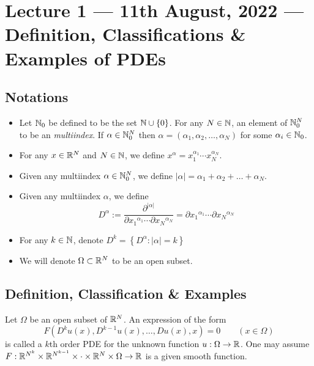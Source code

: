 \section{Lecture 1 --- 11th August, 2022 --- Definition, Classifications \& Examples of PDEs}
\subsection{Notations}
\begin{itemize}[label=--]
    \item Let $\mathbb N _0$ be defined to be the set $\mathbb N \cup \left\{ 0 \right\}$. For any $N\in \mathbb N$, an element of $\mathbb N _ 0 ^N$ to be an \textit{multiindex}. If $\alpha \in \mathbb N _0 ^N$ then $\alpha = \left( \alpha _1 ,\alpha_2,\ldots, \alpha_N \right)$ for some $\alpha_i \in \mathbb N _0$.

    \item For any $x\in \mathbb R ^N$ and $N\in \mathbb N$, we define $x^\alpha = x_1 ^{\alpha_1}\cdots x_N ^{\alpha _N}$.

    \item Given any multiindex $\alpha \in \mathbb N _0 ^N$, we define $|\alpha | =\alpha_1 + \alpha _2 + \ldots + \alpha _N$.

    \item Given any multiindex $\alpha$, we define
\begin{equation*}
    D^{\alpha} := \frac{\partial ^{|\alpha|}}{\partial {x_{1}} ^{\alpha_1} \cdots \partial {x_{N}} ^{\alpha_N}} = \partial { x_1 }^{\alpha _1}\cdots \partial { x_N }^{\alpha_N}
\end{equation*}

\item For any $k\in \mathbb N$, denote $D^k =\left\{ D^{\alpha} : |\alpha| =k \right\}$

\item We will denote $\Omega \subset \mathbb R ^N$ to be an open subset.

\end{itemize}

\subsection{Definition,  Classification \& Examples}
\begin{definition}
Let $\Omega$ be an open subset of $\mathbb R ^N$. An expression of the form  
\begin{equation}
    F\left( D^{k} u(x), D^{k-1} u(x), \ldots , Du(x), x \right)=0 \qquad (x\in \Omega)
    \label{eqn:pde}
\end{equation}
is called a $k$th order PDE for the unknown function $u:\Omega \to \mathbb R$. One may assume $F: \mathbb R ^{N^k} \times \mathbb R^{N^{k-1}} \times \cdot \times \mathbb R ^N \times \Omega \to \mathbb R$ is a given smooth function.

\end{definition}

